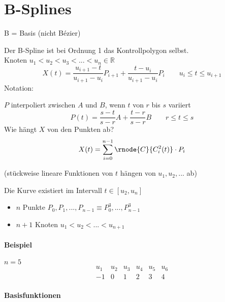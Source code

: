 \section{B-Splines}
B = Basis (nicht Bézier)
\begin{center}
\end{center}
Der B-Spline ist bei Ordnung 1 das Kontrollpolygon selbst.\\[1em]
Knoten $u_1 < u_2 < u_3 < ... < u_n \in \mathbb{R}$
\[
 X(t) = \frac{u_{i+1}-t}{u_{i+1}-u_i} P_{i+1} + \frac{t-u_i}{u_{i+1}-u_i} P_i \qquad u_i \le t \le u_{i+1}
\]
Notation:
\begin{center}
\end{center}
$P$ interpoliert zwischen $A$ und $B$, wenn $t$ von $r$ bis $s$ variiert
\[P(t) = \frac{s-t}{s-r} A + \frac{t-r}{s-r} B \qquad r \le t \le s\]
Wie hängt $X$ von den Punkten ab?
\[X(t) = \sum\limits_{i=0}^{n-1} \rnode{C}{C^2_i(t)} \cdot P_i\]
\begin{center}
  (stückweise lineare Funktionen von $t$ hängen von
	$u_1, u_2, ...$ ab) \\[1em]
\end{center}
\begin{center}
\end{center}
Die Kurve existiert im Intervall $t \in [u_2, u_n]$
\begin{itemize}
 \item $n$ Punkte $P_0, P_1, ..., P_{n-1} \equiv P_0^3, ..., P_{n-1}^3$
 \item $n + 1$ Knoten $u_1 < u_2 < ... < u_{n+1}$
\end{itemize}
\paragraph*{Beispiel} $n = 5$
 \[
	\begin{array}{cccccc}
	 u_1 & u_2 & u_3 & u_4 & u_5 & u_6 \\
	 -1  & 0   & 1   & 2   & 3   & 4
	\end{array}
 \]
\begin{center}
\end{center}

\paragraph*{Basisfunktionen}
\begin{center}
\end{center}

